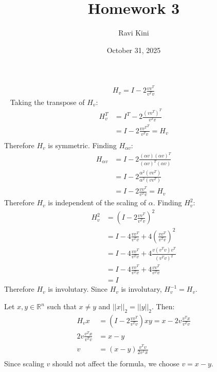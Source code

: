 \documentclass{article}
\title{Homework 3}
\author{Ravi Kini}
\date{October 31, 2025}
\begin{document}
\maketitle

\problem{}
\begin{align*}
    H_v = I - 2\frac{vv^T}{v^T v}
\end{align*}\
Taking the transpose of $H_v$:
\begin{align*}
    H_v^T & = I^T - 2\frac{{(vv^T)}^T}{v^T v} \\
    & = I - 2\frac{{vv^T}^T}{v^T v} = H_v \\
\end{align*}
Therefore $H_v$ is symmetric.
Finding $H_{\alpha v}$:
\begin{align*}
    H_{\alpha v} & = I - 2\frac{(\alpha v){(\alpha v)}^T}{{(\alpha v)}^T(\alpha v)} \\
    & = I - 2\frac{\alpha^2(vv^T)}{\alpha^2(vv^T)} \\
    & = I - 2\frac{vv^T}{v^T v} = H_v
\end{align*}
Therefore $H_v$ is independent of the scaling of $\alpha$.
Finding $H_v^2$:
\begin{align*}
    H_v^2 & = {\left(I - 2\frac{vv^T}{v^T v}\right)}^2 \\
    & = I - 4\frac{vv^T}{v^T v} + 4{\left(\frac{vv^T}{v^T v}\right)}^2 \\
    & = I - 4\frac{vv^T}{v^T v} + 4\frac{v(v^T v)v^T}{{(v^T v)}^2} \\
    & = I - 4\frac{vv^T}{v^T v} + 4\frac{vv^T}{v^T v} \\
    & = I
\end{align*}
Therefore $H_v$ is involutary.
Since $H_v$ is involutary, $H_v^{-1} = H_v$.

\clearpage
\problem{}
Let $x, y \in \mathbb{R}^n$ such that $x \neq y$ and $||x||_2 = ||y||_2$. Then:
\begin{align*}
    H_v x & = \left(I - 2\frac{vv^T}{v^T v} \right)x 
    y = x - 2v\frac{v^T x}{v^T v} \\
    2v\frac{v^T x}{v^T v} & = x - y \\
    v & = (x - y) \frac{v^T v}{2v^T x} \\
\end{align*}
Since scaling $v$ should not affect the formula, we choose $v = x - y$.
\end{document}
